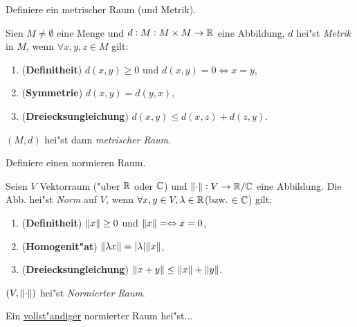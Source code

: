 \documentclass[9pt]{article}
\newcommand{\R}[1]{%
	\ifthenelse{\equal{#1}{}}
		{\mathbb{R}}
		{\mathbb{R}^#1}}%
\newcommand{\C}[1]{%
	\ifthenelse{\equal{#1}{}}
	{\mathbb{C}}
	{\mathbb{C}^#1}}%
\newenvironment{field}{}{\newpage}
\newif\ifnote
\newenvironment{note}{\notetrue}{\notefalse}
\newcommand{\localtag}{}
\newcommand{\globaltag}{}
\newcommand{\uuid}{}
\newcommand{\tags}[1]{
    \ifnote 
        \renewcommand{\localtag}{#1}
    \else
        \renewcommand{\globaltag}{#1}
    \fi 
    }
\newcommand{\xplain}[1]{\renewcommand{\uuid}{#1}}
\begin{document}

\tags{mathe2::2sem::hilbertraum}

\begin{note}
	\xplain{UUID}
	\tags{satzt, metrischer-raum}
	
	\begin{field}  %
		Definiere ein metrischer Raum (und Metrik).
	\end{field}
	
	\begin{field}  %
		Sien $M \neq \emptyset$ eine Menge und $d: M: M \times M \rightarrow \R{}$ eine Abbildung,
		$d$ hei"st \textit{Metrik} in $M$, wenn $\forall x,y,z \in M$ gilt:
		\begin{enumerate}
			\item (\textbf{Definitheit}) $d(x,y) \geq 0$ und $d(x,y) = 0 \Leftrightarrow x=y $,
			\item (\textbf{Symmetrie}) $d(x,y) = d(y,x)$,
			\item (\textbf{Dreiecksungleichung}) $d(x,y) \leq d(x,z) + d(z,y)$.
		\end{enumerate}
	$(M,d)$ hei"st dann \textit{metrischer Raum}.
	\end{field}
		
	\begin{field}  %
		Definiere einen normieren Raum.
	\end{field}
	
	\begin{field}  %
		Seien $V$ Vektorraum ("uber $\R{}$ oder $\C{}$) und $\norm{\cdot} : V \rightarrow \R{}/\C{}$ eine Abbildung. Die Abb. hei"st \textit{Norm} auf $V$, wenn $\forall x,y \in V, \lambda \in \R{} $(bzw. $\in \C{}$) gilt:
		\begin{enumerate}
			\item (\textbf{Definitheit}) $\norm{x} \geq 0$ und $\norm{x} = \Leftrightarrow x =0$,
			\item (\textbf{Homogenit"at}) $\norm{\lambda x} = \abs{\lambda} \norm{x}$,
			\item (\textbf{Dreiecksungleichung}) $\norm{x+y} \leq \norm{x} + \norm{y}$.
		\end{enumerate}
	$(V,\norm{\cdot})$ hei"st \textit{Normierter Raum}.
	\end{field}
		
	\begin{field}  %
		Ein \underline{vollst"andiger} normierter Raum hei"st...
	\end{field}
	

\end{note}
\end{document}
